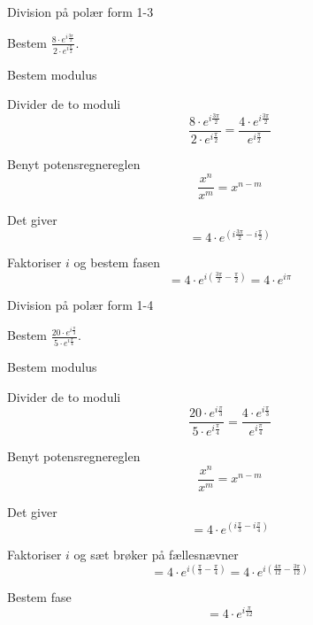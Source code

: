 \documentclass{article}
\begin{document}
\newpage

\begin{exercise}{Division på polær form 1-3}
	
	Bestem $ \frac{8 \cdot e^{i \frac{3 \pi}{2}}}{2 \cdot e^{i \frac{\pi}{2}}}$.
	
	
	
	\hint 
	
	Bestem modulus
	
	
	\hint
	
	Divider de to moduli
	\[
	\frac{8 \cdot e^{i \frac{3 \pi}{2}}}{2 \cdot e^{i \frac{\pi}{2}}} = \frac{4 \cdot e^{i \frac{3 \pi}{2}}}{e^{i \frac{\pi}{2}}}
	\]
	
	\hint 
	
	Benyt potensregnereglen
	\[
	\frac{x^n}{x^m} = x^{n-m}
	\]
	
	\hint
	
	Det giver
	\[
	= 4 \cdot e^{(i \frac{3 \pi}{2}-i \frac{\pi}{2})}
	\]
	
	\hint
	
	Faktoriser $i$ og bestem fasen
	\[
	= 4 \cdot e^{i( \frac{3 \pi}{2}-\frac{\pi}{2})} = 4 \cdot e^{i \pi}
	\]
	
	
\end{exercise}

\newpage

\begin{exercise}{Division på polær form 1-4}
	
	Bestem $ \frac{20\cdot e^{i \frac{\pi}{3}}}{5 \cdot e^{i \frac{\pi}{4}}}$.
	
	
	
	\hint 
	
	Bestem modulus
	
	
	\hint
	
	Divider de to moduli
	\[
	\frac{20\cdot e^{i \frac{\pi}{3}}}{5 \cdot e^{i \frac{\pi}{4}}} = \frac{4\cdot e^{i \frac{\pi}{3}}}{ e^{i \frac{\pi}{4}}}
	\]
	
	\hint 
	
	Benyt potensregnereglen
	\[
	\frac{x^n}{x^m} = x^{n-m}
	\]
	
	\hint
	
	Det giver
	\[
	= 4\cdot e^{(i \frac{\pi}{3}-i \frac{\pi}{4})}
	\]
	
	\hint
	
	Faktoriser $i$ og sæt brøker på fællesnævner
	\[
	= 4\cdot e^{i( \frac{\pi}{3}- \frac{\pi}{4})} = 4\cdot e^{i( \frac{4\pi}{12}- \frac{3\pi}{12})} 
	\]
	
	\hint
	
	Bestem fase
	\[
	= 4 \cdot e^{i \frac{\pi}{12}}
	\]
	
	
\end{exercise}
\end{document}
